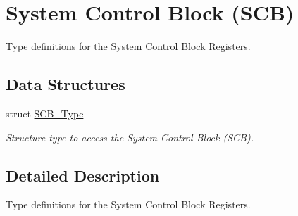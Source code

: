 \hypertarget{group___c_m_s_i_s___s_c_b}{\section{System Control Block (S\-C\-B)}
\label{group___c_m_s_i_s___s_c_b}
}


Type definitions for the System Control Block Registers.  


\subsection*{Data Structures}
\begin{DoxyCompactItemize}
\item 
struct \hyperlink{struct_s_c_b___type}{S\-C\-B\-\_\-\-Type}
\begin{DoxyCompactList}\small\item\em Structure type to access the System Control Block (S\-C\-B). \end{DoxyCompactList}\end{DoxyCompactItemize}


\subsection{Detailed Description}
Type definitions for the System Control Block Registers. 